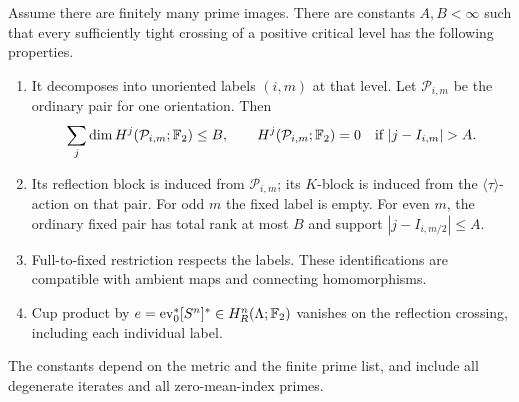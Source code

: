 \begin{theorem}\label{thm:local-control}
Assume there are finitely many prime images.  There are constants
\(A,B<\infty\) such that every sufficiently tight crossing of a
positive critical level has the following properties.
\begin{enumerate}[label=\textup{(\roman*)}]
\item It decomposes into unoriented labels \((i,m)\) at that
level.  Let \(\mathcal P_{i,m}\) be the ordinary pair for one
orientation.  Then
\[
 \sum_j\dim H^j(\mathcal P_{i,m};\kk)\le B,\qquad
 H^j(\mathcal P_{i,m};\kk)=0
                  \quad\text{if }|j-I_{i,m}|>A.
\]
\item Its reflection block is induced from \(\mathcal P_{i,m}\);
its \(K\)-block is induced from the
\(\langle\tau\rangle\)-action on that pair.  For odd \(m\)
the fixed label is empty.  For even \(m\), the ordinary fixed
pair has total rank at most \(B\) and support
\(|j-I_{i,m/2}|\le A\).
\item Full-to-fixed restriction respects the labels.  These
identifications are compatible with ambient maps and
connecting homomorphisms.
\item Cup product by
\(e=\operatorname{ev}_0^*[S^n]^*\in H_R^n(\Lambda;\mathbb F_2)\) vanishes on
the reflection crossing, including each individual label.
\end{enumerate}
The constants depend on the metric and the finite prime list,
and include all degenerate iterates and all zero-mean-index
primes.
\end{theorem}

